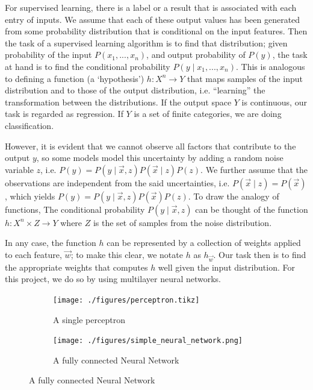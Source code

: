 \documentclass[12pt,a4paper,]{report}
\begin{document}
For supervised learning, there is a label or a result that is associated
with each entry of inputs. We assume that each of these output values
has been generated from some probability distribution that is
conditional on the input features. Then the task of a supervised
learning algorithm is to find that distribution; given probability of
the input \(P(x_1, ..., x_n)\), and output probability of \(P(y)\), the
task at hand is to find the conditional probability
\(P(y \mid x_1, ..., x_n)\). This is analogous to defining a function (a
`hypothesis') \(h: X^n \rightarrow Y\) that maps samples of the input
distribution and to those of the output distribution, i.e. ``learning''
the transformation between the distributions. If the output space \(Y\)
is continuous, our task is regarded as regression. If \(Y\) is a set of
finite categories, we are doing classification.

However, it is evident that we cannot observe all factors that
contribute to the output \(y\), so some models model this uncertainty by
adding a random noise variable \(z\), i.e.
\(P(y) = P(y \mid \vec{x}, z) P(\vec{x} \mid z) P(z)\). We further
assume that the observations are independent from the said
uncertainties, i.e. \(P(\vec{x} \mid z) = P(\vec{x})\), which yields
\(P(y) = P(y \mid \vec{x}, z) P(\vec{x}) P(z)\). To draw the analogy of
functions, The conditional probability \(P(y \mid \vec{x}, z)\) can be
thought of the function \(h: X^n \times Z \rightarrow Y\) where \(Z\) is
the set of samples from the noise distribution.

In any case, the function \(h\) can be represented by a collection of
weights applied to each feature, \(\vec{w}\); to make this clear, we
notate \(h\) as \(h_{\vec{w}}\). Our task then is to find the
appropriate weights that computes \(h\) well given the input
distribution. For this project, we do so by using multilayer neural
networks.

\begin{figure}[h]
    \begin{subfigure}{.5\textwidth}
        \texttt{[image: ./figures/perceptron.tikz]}
        \centering
        \caption{A single perceptron} \label{fig:perceptron}
    \end{subfigure}
    \begin{subfigure}{.5\textwidth}
        \texttt{[image: ./figures/simple\_neural\_network.png]}
        \centering
        \caption{A fully connected Neural Network}
    \end{subfigure}
\end{figure}
\end{document}
